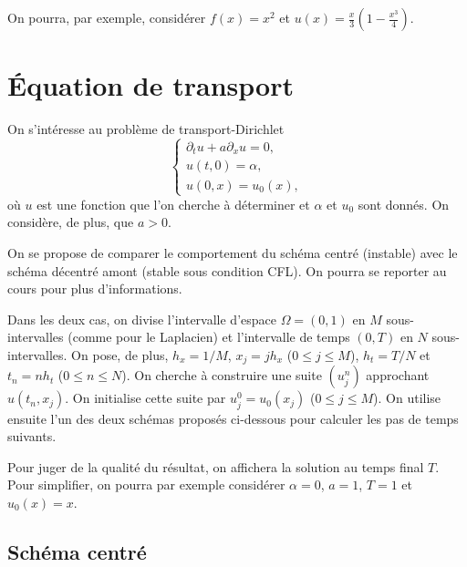 \documentclass[12pt]{article}
\begin{document}
On pourra, par exemple, consid\'erer $f(x) = x^2$ et $u(x) = \frac{x}{3}(1-\frac{x^3}{4})$.


\section{\'Equation de transport}

On s'int\'eresse au probl\`eme de transport-Dirichlet
\begin{equation}
  \label{eq:transport}
  \left\{
    \begin{array}{l}
      \partial_t u + a \partial_x u = 0 ,
      \\
      u(t,0) = \alpha ,
      \\
      u(0,x) = u_0(x) ,
    \end{array}
  \right.
\end{equation}
o\`u $u$ est une fonction que l'on cherche \`a d\'eterminer et
$\alpha$ et $u_0$ sont donn\'es. On consid\`ere, de plus, que $a > 0$.

On se propose de comparer le comportement du sch\'ema centr\'e (instable)
avec le sch\'ema d\'ecentr\'e amont (stable sous condition CFL).
On pourra se reporter au cours pour plus d'informations.


Dans les deux cas, on divise l'intervalle d'espace $\Omega = (0,1)$ en
$M$ sous-intervalles (comme pour le Laplacien) et l'intervalle de temps
$(0,T)$ en $N$ sous-intervalles.
On pose, de plus, $h_x = 1/M$, $x_j = jh_x$ ($0 \leq j \leq M$),
$h_t = T/N$ et $t_n = nh_t$ ($0 \leq n \leq N$).
On cherche \`a construire une suite $(u_j^n)$ approchant $u(t_n,x_j)$.
On initialise cette suite par $u_j^0 = u_0(x_j)$ ($0 \leq j \leq M$).
On utilise ensuite l'un des deux sch\'emas propos\'es ci-dessous pour
calculer les pas de temps suivants.


Pour juger de la qualit\'e du r\'esultat, on affichera la solution au temps final $T$.
Pour simplifier, on pourra par exemple consid\'erer $\alpha = 0$, $a=1$, $T=1$ et $u_0(x) = x$.

\subsection{Sch\'ema centr\'e}
\end{document}
